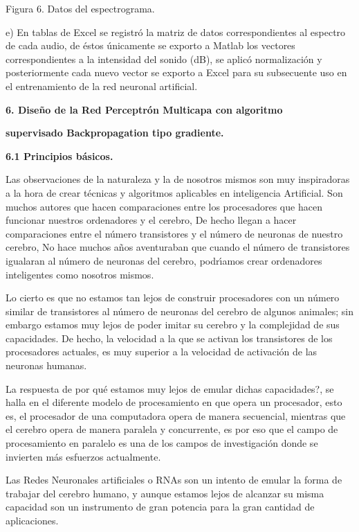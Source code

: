 \begin{center}
Figura 6. Datos del espectrograma.
\end{center}

e) En tablas de Excel se registr\'{o} la matriz de datos correspondientes al
espectro de cada audio, de \'{e}stos \'{u}nicamente se exporto a Matlab los
vectores correspondientes a la intensidad del sonido (dB), se aplic\'{o}
normalizaci\'{o}n y posteriormente cada nuevo vector se exporto a Excel para
su subsecuente uso en el entrenamiento de la red neuronal artificial.

\textbf{6. Dise\~{n}o de la Red Perceptr\'{o}n Multicapa con algoritmo }

\textbf{\qquad supervisado Backpropagation tipo gradiente.}

\textbf{6.1 Principios b\'{a}sicos.}

Las observaciones de la naturaleza y la de nosotros mismos son muy
inspiradoras a la hora de crear t\'{e}cnicas y algoritmos aplicables en
inteligencia Artificial. Son muchos autores que hacen comparaciones entre los
procesadores que hacen funcionar nuestros ordenadores y el cerebro, De hecho
llegan a hacer comparaciones entre el n\'{u}mero transistores y el n\'{u}mero
de neuronas de nuestro cerebro, No hace muchos a\~{n}os aventuraban que cuando
el n\'{u}mero de transistores igualaran al n\'{u}mero de neuronas del cerebro,
podr\'{\i}amos crear ordenadores inteligentes como nosotros mismos.

Lo cierto es que no estamos tan lejos de construir procesadores con un
n\'{u}mero similar de transistores al n\'{u}mero de neuronas del cerebro de
algunos animales; sin embargo estamos muy lejos de poder imitar su cerebro y
la complejidad de sus capacidades. De hecho, la velocidad a la que se activan
los transistores de los procesadores actuales, es muy superior a la velocidad
de activaci\'{o}n de las neuronas humanas.

La respuesta de \textquestiondown por qu\'{e} estamos muy lejos de emular
dichas capacidades?, se halla en el diferente modelo de procesamiento en que
opera un procesador, esto es, el procesador de una computadora opera de manera
secuencial, mientras que el cerebro opera de manera paralela y concurrente, es
por eso que el campo de procesamiento en paralelo es una de los campos de
investigaci\'{o}n donde se invierten m\'{a}s esfuerzos actualmente.

Las Redes Neuronales artificiales o RNAs son un intento de emular la forma de
trabajar del cerebro humano, y aunque estamos lejos de alcanzar su misma
capacidad son un instrumento de gran potencia para la gran cantidad de aplicaciones.

